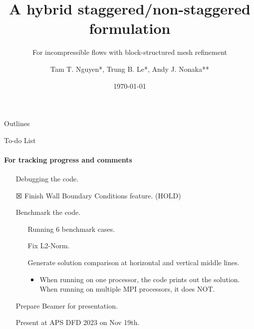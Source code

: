 \documentclass{beamer}
\title{A hybrid staggered/non-staggered formulation}
\subtitle{For incompressible flows with block-structured mesh refinement}
\date{\today}
\author{Tam T. Nguyen*, Trung B. Le*, Andy J. Nonaka**}
\institute{*North Dakota State University \\
			**Lawrence Berkeley National Laboratory}
\begin{document}
\maketitle

\begin{frame}{Outlines}
	\tableofcontents
\end{frame}

\begin{frame}[fragile]{To-do List}
	\framesubtitle{For tracking progress and comments}
  \begin{itemize}
  	\item[\CheckedBox] Debugging the code.
  	\item[$\XBox$] Finish Wall Boundary Conditions feature. (HOLD)
  	\item[\Square] Benchmark the code.
  		\begin{itemize}
  			\item[\Square] Running 6 benchmark cases.
  			\item[\CheckedBox] Fix L2-Norm.
  			\item[\Square] Generate solution comparison at horizontal and vertical middle lines.
  			\begin{itemize}
  				\item When running on one processor, the code prints out the solution. When running on multiple MPI processors, it does NOT.
  			\end{itemize}
  		\end{itemize} 
  	\item[\Square] Prepare Beamer for presentation.
  	\item[\Square] Present at APS DFD 2023 on Nov 19th.
  \end{itemize}

\end{frame}


\end{document}
